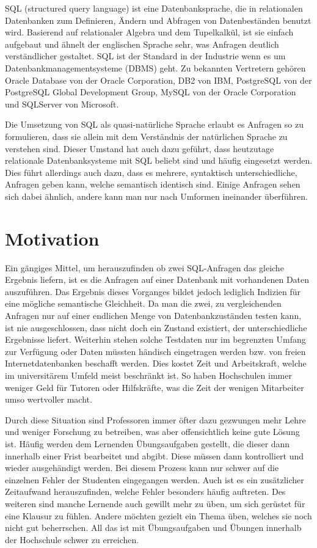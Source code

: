 
SQL (structured query language) ist eine Datenbanksprache, die in relationalen Datenbanken zum Definieren, Ändern und Abfragen von Datenbeständen benutzt wird. Basierend auf relationaler Algebra und dem Tupelkalkül, ist sie einfach aufgebaut und ähnelt der englischen Sprache sehr, was Anfragen deutlich verständlicher gestaltet. SQL ist der Standard in der Industrie wenn es um Datenbankmanagementsysteme (DBMS) geht. Zu bekannten Vertretern gehören Oracle Database von der Oracle Corporation, DB2 von IBM, PostgreSQL von der PostgreSQL Global Development Group, MySQL von der Oracle Corporation und SQLServer von Microsoft.

Die Umsetzung von SQL als quasi-natürliche Sprache erlaubt es Anfragen so zu formulieren, dass sie allein mit dem Verständnis der natürlichen Sprache zu verstehen sind. Dieser Umstand hat auch dazu geführt, dass heutzutage relationale Datenbanksysteme mit SQL beliebt sind und häufig eingesetzt werden. 
Dies führt allerdings auch dazu, dass es mehrere, syntaktisch unterschiedliche, Anfragen geben kann, welche semantisch identisch sind. Einige Anfragen sehen sich dabei ähnlich, andere kann man nur nach Umformen ineinander überführen. 

\section{Motivation}

Ein gängiges Mittel, um herauszufinden ob zwei SQL-Anfragen das gleiche Ergebnis liefern, ist es die Anfragen auf einer Datenbank mit vorhandenen Daten auszuführen. Das Ergebnis dieses Vorganges bildet jedoch lediglich Indizien für eine mögliche semantische Gleichheit. Da man die zwei, zu vergleichenden Anfragen nur auf einer endlichen Menge von Datenbankzuständen testen kann, ist nie ausgeschlossen, dass nicht doch ein Zustand existiert, der unterschiedliche Ergebnisse liefert. Weiterhin stehen solche Testdaten nur im begrenzten Umfang zur Verfügung oder Daten müssten händisch eingetragen werden bzw. von freien Internetdatenbanken beschafft werden. Dies kostet Zeit und Arbeitskraft, welche im universitärem Umfeld meist beschränkt ist. So haben Hochschulen immer weniger Geld für Tutoren oder Hilfskräfte, was die Zeit der wenigen Mitarbeiter umso wertvoller macht.

Durch diese Situation sind Professoren immer öfter dazu gezwungen mehr Lehre und weniger Forschung zu betreiben, was aber offensichtlich keine gute Lösung ist. Häufig werden dem Lernenden Übungsaufgaben gestellt, die dieser dann innerhalb einer Frist bearbeitet und abgibt. Diese müssen dann kontrolliert und wieder ausgehändigt werden. Bei diesem Prozess kann nur schwer auf die einzelnen Fehler der Studenten eingegangen werden. Auch ist es ein zusätzlicher Zeitaufwand herauszufinden, welche Fehler besonders häufig auftreten. Des weiteren sind manche Lernende auch gewillt mehr zu üben, um sich gerüstet für eine Klausur zu fühlen. Andere möchten gezielt ein Thema üben, welches sie noch nicht gut beherrschen. All das ist mit Übungsaufgaben und Übungen innerhalb der Hochschule schwer zu erreichen. 

